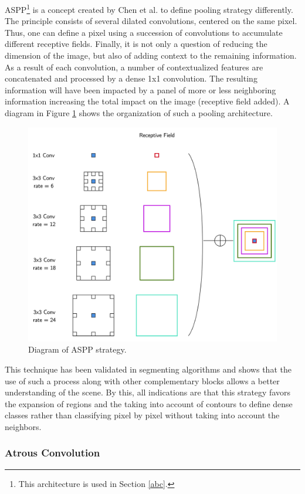ASPP\footnote{This architecture is used in Section \ref{abc}.} is a concept created by Chen et al. \cite{chen2017deeplab} to define pooling strategy differently. The principle consists of several dilated convolutions, centered on the same pixel. Thus, one can define a pixel using a succession of convolutions to accumulate different receptive fields. Finally, it is not only a question of reducing the dimension of the image, but also of adding context to the remaining information. 
As a result of each convolution, a number of contextualized features are concatenated and processed by a dense 1x1 convolution. The resulting information will have been impacted by a panel of more or less neighboring information increasing the total impact on the image (receptive field added).
A diagram in Figure \ref{fig:aspp} shows the organization of such a pooling architecture.

\begin{figure}[h]
	\centering
	\includegraphics[width=0.8\linewidth]{Figures/Preliminary/aspp}
	\caption{Diagram of ASPP strategy.}
	\label{fig:aspp}
\end{figure}


This technique has been validated in segmenting algorithms and shows that the use of such a process along with other complementary blocks allows a better understanding of the scene. By this, all indications are that this strategy favors the expansion of regions and the taking into account of contours to define dense classes rather than classifying pixel by pixel without taking into account the neighbors.


\subsubsection{Atrous Convolution}

